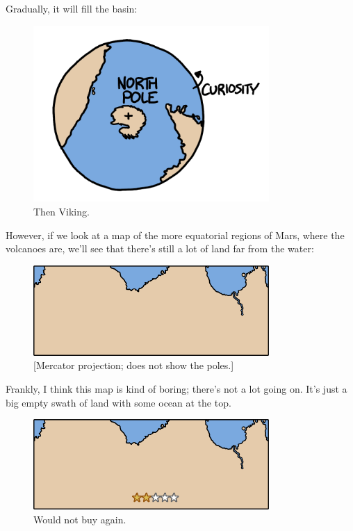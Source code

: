 {{Gradually, it will fill the basin:}

\begin{figure}[!htbp]
\centering
\includegraphics[scale=0.5, max width=0.8\textwidth]{imgs/a/54/mars_6.png}
\caption{Then Viking.}
\end{figure}

{However, if we look at a map of the more equatorial regions of Mars, where the volcanoes are, we'll see that there's still a lot of land far from the water:}

\begin{figure}[!htbp]
\centering
\includegraphics[scale=0.5, max width=0.8\textwidth]{imgs/a/54/mars_7.png}
\caption{[Mercator projection; does not show the poles.]}
\end{figure}

{Frankly, I think this map is kind of boring; there's not a lot going on. It's just a big empty swath of land with some ocean at the top.}

\begin{figure}[!htbp]
\centering
\includegraphics[scale=0.5, max width=0.8\textwidth]{imgs/a/54/mars_7_stars.png}
\caption{Would not buy again.}
\end{figure}

}
